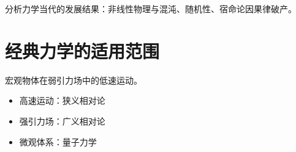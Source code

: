分析力学当代的发展结果：非线性物理与混沌、随机性、宿命论因果律破产。

\section{经典力学的适用范围}

{\heiti 宏观物体}在{\heiti 弱引力场}中的{\heiti 低速}运动。

\begin{itemize}
    \item {\heiti 高速运动}：狭义相对论
    \item {\heiti 强引力场}：广义相对论
    \item {\heiti 微观体系}：量子力学
\end{itemize}




